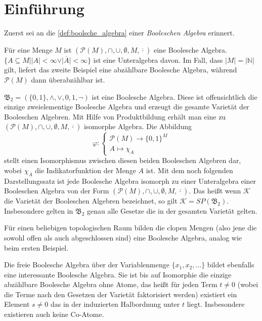 \section{Einführung}

Zuerst sei an die \cref{def:boolsche_algebra} einer \emph{Booleschen Algebra} erinnert.

\begin{example}
    Für eine Menge $M$ ist $(\mathcal{P}(M), \cap, \cup, \emptyset, M, \overline{\cdot})$ eine Boolesche Algebra. $\{A \subseteq M \mid \vert A\vert < \infty \lor \vert \overline{A} \vert < \infty\}$ ist eine Unteralgebra davon. Im Fall, dass $|M|=|\mathbb{N}|$ gilt, liefert das zweite Beispiel eine abzählbare Boolesche Algebra, während $\mathcal{P}(M)$ dann überabzählbar ist.
\end{example}
\begin{example}
    $\mathfrak{B}_2 = (\{0,1\}, \land, \lor, 0, 1, \lnot)$ ist eine Boolesche Algebra. Diese ist offensichtlich die einzige zweielementige Boolesche Algebra und erzeugt die gesamte Varietät der Booleschen Algebren. Mit Hilfe von Produktbildung erhält man eine zu $(\mathcal{P}(M),\cap,\cup,\emptyset,M,\overline{\cdot})$ isomorphe Algebra. Die Abbildung
    $$\varphi:
    \begin{cases}
        \mathcal{P}(M)\to \{0,1\}^M\\
        A\mapsto \chi_A
    \end{cases}$$
    stellt einen Isomorphismus zwischen diesen beiden Booleschen Algebren dar, wobei $\chi_A$ die Indikatorfunktion der Menge $A$ ist. Mit dem noch folgenden Darstellungssatz ist jede Boolesche Algebra isomorph zu einer Unteralgebra einer Booleschen Algebra von der Form $(\mathcal{P}(M),\cap,\cup,\emptyset,M,\overline{\cdot})$. Das heißt wenn $\mathcal{K}$ die Varietät der Booleschen Algebren bezeichnet, so gilt $\mathcal{K}=SP(\mathfrak{B}_2)$. Insbesondere gelten in $\mathfrak{B}_2$ genau alle Gesetze die in der gesamten Varietät gelten.
\end{example}

\begin{example}
    Für einen beliebigen topologischen Raum bilden die clopen Mengen (also jene die sowohl offen als auch abgeschlossen sind) eine Boolesche Algebra, analog wie beim ersten Beispiel.
\end{example}

\begin{example}
    Die freie Boolesche Algebra über der Variablenmenge $\{x_1,x_2,\ldots\}$ bildet ebenfalls eine interessante Boolesche Algebra. Sie ist bis auf Isomorphie die einzige abzählbare Boolesche Algebra ohne Atome, das heißt für jeden Term $t\neq 0$ (wobei die Terme nach den Gesetzen der Varietät faktorisiert werden) existiert ein Element $s\neq 0$ das in der induzierten Halbordnung unter $t$ liegt. Insbesondere existieren auch keine Co-Atome.
\end{example}

